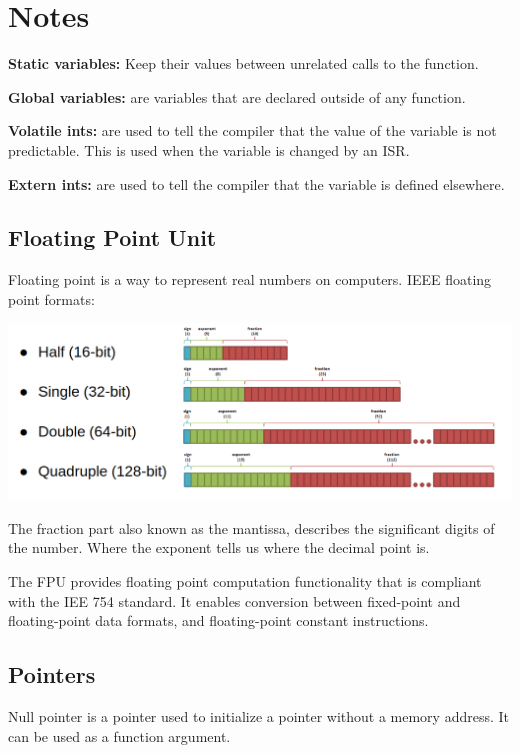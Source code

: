 \section{Notes}


\textbf{Static variables:} Keep their values between unrelated calls to the function.

\textbf{Global variables:} are variables that are declared outside of any function.

\textbf{Volatile ints:} are used to tell the compiler that the value of the variable
is not predictable. This is used when the variable is changed by an ISR.

\textbf{Extern ints:} are used to tell the compiler that the variable is defined elsewhere.

\subsection{Floating Point Unit}
Floating point is a way to represent real numbers on computers.
IEEE floating point formats:

\begin{center}
	\includegraphics[width=\textwidth]{images/FPU.png}
\end{center}

The fraction part also known as the mantissa, describes
the significant digits of the number.
Where the exponent tells us where the decimal point is.



The FPU provides floating point computation functionality
that is compliant with the IEE 754 standard.
It enables conversion between fixed-point and floating-point data
formats, and floating-point constant instructions.

\subsection{Pointers}
Null pointer is a pointer used to initialize a pointer without
a memory address. It can be used as a function argument.

